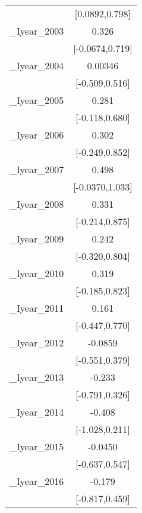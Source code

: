 {\begin{tabular}{l*{1}{c}}
            &        [0.0892,0.798]         \\
[1em]
\_Iyear\_2003 &                 0.326         \\
            &       [-0.0674,0.719]         \\
[1em]
\_Iyear\_2004 &               0.00346         \\
            &        [-0.509,0.516]         \\
[1em]
\_Iyear\_2005 &                 0.281         \\
            &        [-0.118,0.680]         \\
[1em]
\_Iyear\_2006 &                 0.302         \\
            &        [-0.249,0.852]         \\
[1em]
\_Iyear\_2007 &                 0.498         \\
            &       [-0.0370,1.033]         \\
[1em]
\_Iyear\_2008 &                 0.331         \\
            &        [-0.214,0.875]         \\
[1em]
\_Iyear\_2009 &                 0.242         \\
            &        [-0.320,0.804]         \\
[1em]
\_Iyear\_2010 &                 0.319         \\
            &        [-0.185,0.823]         \\
[1em]
\_Iyear\_2011 &                 0.161         \\
            &        [-0.447,0.770]         \\
[1em]
\_Iyear\_2012 &               -0.0859         \\
            &        [-0.551,0.379]         \\
[1em]
\_Iyear\_2013 &                -0.233         \\
            &        [-0.791,0.326]         \\
[1em]
\_Iyear\_2014 &                -0.408         \\
            &        [-1.028,0.211]         \\
[1em]
\_Iyear\_2015 &               -0.0450         \\
            &        [-0.637,0.547]         \\
[1em]
\_Iyear\_2016 &                -0.179         \\
            &        [-0.817,0.459]         \\

\end{tabular}}
